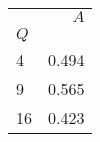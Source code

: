 \begin{tabular}{lr}
\toprule
{} &    $A$ \\
$Q$ &        \\
\midrule
4   &  0.494 \\
9   &  0.565 \\
16  &  0.423 \\
\bottomrule
\end{tabular}
